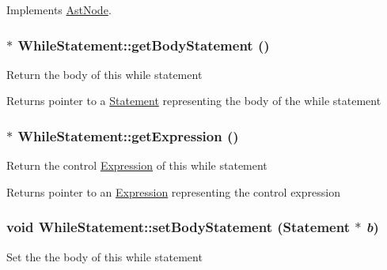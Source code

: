 Implements \hyperlink{classAstNode_a67b2d6ce1262da2954fb4db255759fb3}{AstNode}.\hypertarget{classWhileStatement_a68631c014236d2a635aa4395c6dd229c}{
\subsubsection[{getBodyStatement}]{$\ast$ WhileStatement::getBodyStatement ()}}
\label{classWhileStatement_a68631c014236d2a635aa4395c6dd229c}
Return the body of this while statement

\begin{DoxyReturn}{Returns}
pointer to a \hyperlink{classStatement}{Statement} representing the body of the while statement 
\end{DoxyReturn}
\hypertarget{classWhileStatement_a8ccd99538f16bc15feb7f7eff947a923}{
\subsubsection[{getExpression}]{$\ast$ WhileStatement::getExpression ()}}
\label{classWhileStatement_a8ccd99538f16bc15feb7f7eff947a923}
Return the control \hyperlink{classExpression}{Expression} of this while statement

\begin{DoxyReturn}{Returns}
pointer to an \hyperlink{classExpression}{Expression} representing the control expression 
\end{DoxyReturn}
\hypertarget{classWhileStatement_abde6377670b22bad622f1a2ec2aade65}{
\subsubsection[{setBodyStatement}]{\setlength{\rightskip}{0pt plus 5cm}void WhileStatement::setBodyStatement ({\bf Statement} $\ast$ {\em b})}}
\label{classWhileStatement_abde6377670b22bad622f1a2ec2aade65}
Set the the body of this while statement


